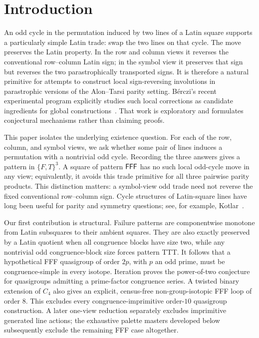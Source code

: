 \section{Introduction}

An odd cycle in the permutation induced by two lines of a Latin square
supports a particularly simple Latin trade: swap the two lines on that cycle.
The move preserves the Latin property.  In the row and column views it
reverses the conventional row--column Latin sign; in the symbol view it
preserves that sign but reverses the two parastrophically transported signs.
It is therefore a natural primitive for attempts to construct local
sign-reversing involutions in parastrophic versions of the Alon--Tarsi parity
setting.  B\'erczi's
recent experimental program explicitly studies such local corrections as
candidate ingredients for global constructions~\cite{Berczi2026}.  That work
is exploratory and formulates conjectural mechanisms rather than claiming
proofs.

This paper isolates the underlying existence question.  For each of the row,
column, and symbol views, we ask whether some pair of lines induces a
permutation with a nontrivial odd cycle.  Recording the three answers gives a
pattern in $\{F,T\}^3$.  A square of pattern $\mathsf{FFF}$ has no such local
odd-cycle move in any view; equivalently, it avoids this trade primitive for
all three pairwise parity products.  This distinction matters: a symbol-view
odd trade need not reverse the fixed conventional row--column sign.  Cycle
structures of Latin-square lines have long been useful for parity and
symmetry questions; see, for example, Kotlar~\cite{Kotlar2012}.

Our first contribution is structural.  Failure patterns are componentwise
monotone from Latin subsquares to their ambient squares.  They are also
exactly preserved by a Latin quotient when all congruence blocks have size
two, while any nontrivial odd congruence-block size forces pattern TTT.  It
follows that a hypothetical FFF quasigroup of order $2p$, with $p$ an odd
prime, must be congruence-simple in every isotope.  Iteration proves the
power-of-two conjecture for quasigroups admitting a prime-factor congruence
series.  A twisted binary extension of $C_4$ also gives an explicit,
census-free non-group-isotopic FFF loop of order $8$.  This excludes every
congruence-imprimitive order-$10$ quasigroup construction.  A later
one-view reduction separately excludes imprimitive generated line actions;
the exhaustive palette masters developed below subsequently exclude the
remaining FFF case altogether.

